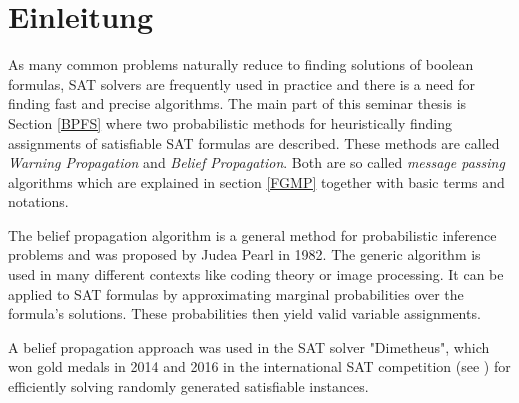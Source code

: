 \chapter{Einleitung}

As many common problems naturally reduce to finding solutions of boolean formulas, SAT solvers are frequently used in practice and there is a need for finding fast and precise algorithms.  
The main part of this seminar thesis is Section \ref{BPFS} where two probabilistic methods for heuristically finding assignments of satisfiable SAT formulas are described. These methods are called \emph{Warning Propagation} and \emph{Belief Propagation}. Both are so called \emph{message passing} algorithms which are explained in section \ref{FGMP} together with basic terms and notations.

The belief propagation algorithm is a general method for probabilistic inference problems and was proposed by Judea Pearl in 1982. The generic algorithm is used in many different contexts like coding theory or image processing. It can be applied to SAT formulas by approximating marginal probabilities over the formula's solutions. These probabilities then yield valid variable assignments.

A belief propagation approach was used in the SAT solver "Dimetheus", which won gold medals in 2014 and 2016 in the international SAT competition (see \cite{satcomp}) for efficiently solving randomly generated satisfiable instances.